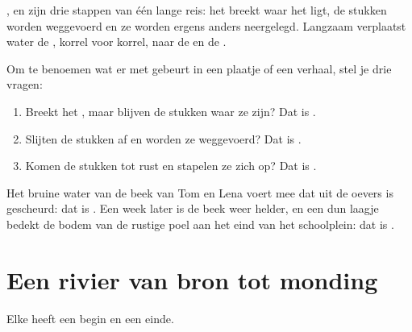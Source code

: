 ,  en  zijn drie stappen van één lange reis: het
 breekt waar het ligt, de stukken worden weggevoerd en ze worden
ergens anders neergelegd. Langzaam verplaatst water de , korrel voor
korrel, naar de  en de .

\begin{method}\label{met:g5:water-shapes-the-land:naming}
Om te benoemen wat er met  gebeurt in een plaatje of een verhaal,
stel je drie vragen:
\begin{enumerate}
  \item Breekt het , maar blijven de stukken waar ze zijn?
        Dat is \emph{}.
  \item Slijten de stukken af en worden ze weggevoerd? Dat is
        \emph{}.
  \item Komen de stukken tot rust en stapelen ze zich op? Dat is
        \emph{}.
\end{enumerate}
\end{method}

\begin{example}\label{ex:g5:water-shapes-the-land:stream}
Het bruine water van de beek van Tom en Lena voert  mee dat uit de
oevers is gescheurd: dat is . Een week later is de beek weer helder,
en een dun laagje  bedekt de bodem van de rustige poel aan het eind
van het schoolplein: dat is .
\end{example}

\section{Een rivier van bron tot monding}

Elke  heeft een begin en een einde.

